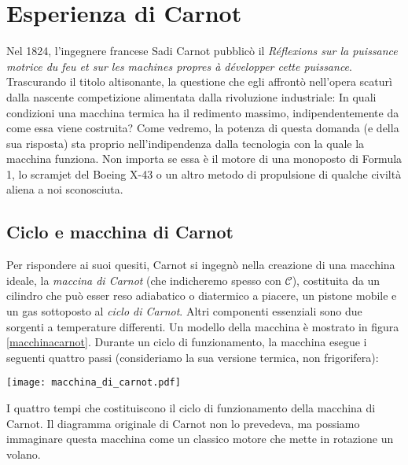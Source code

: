 \section{Esperienza di Carnot}
Nel 1824, l'ingegnere francese Sadi Carnot pubblicò il
\textit{Réflexions sur la puissance motrice du feu et sur les machines
propres à développer cette puissance}. Trascurando il titolo
altisonante, la questione che egli affrontò nell'opera
scaturì dalla nascente competizione alimentata dalla rivoluzione industriale:
In quali condizioni una macchina termica ha il redimento
massimo, indipendentemente da come essa viene costruita? Come
vedremo, la potenza di questa domanda (e della sua risposta) sta
proprio nell'indipendenza dalla tecnologia con la quale la
macchina funziona. Non importa se essa è il motore di una monoposto
di Formula 1, lo scramjet del Boeing X-43 o un altro metodo di
propulsione di qualche civiltà aliena a noi sconosciuta.


\subsection{Ciclo e macchina di Carnot}
Per rispondere ai suoi quesiti,
Carnot si ingegnò nella creazione di una macchina ideale,
la \textit{maccina di Carnot} (che indicheremo spesso con $\mathcal{C}$),
costituita da un cilindro che può esser reso adiabatico o
diatermico a piacere, un pistone mobile e un gas sottoposto al
\textit{ciclo di Carnot}. Altri componenti essenziali sono due
sorgenti a temperature differenti.
Un modello della macchina è mostrato in figura \ref{macchinacarnot}.
Durante un ciclo
di funzionamento, la macchina esegue i seguenti quattro passi
(consideriamo la sua versione termica, non frigorifera):


\begin{marginfigure}
    \centering
    \texttt{[image: macchina\_di\_carnot.pdf]}
    \caption{I quattro tempi che costituiscono il ciclo di funzionamento della macchina di Carnot.
    Il diagramma originale di Carnot non lo prevedeva, ma possiamo immaginare questa macchina come
    un classico motore che mette in rotazione un volano.}
    \label{macchinacarnot}
\end{marginfigure}

